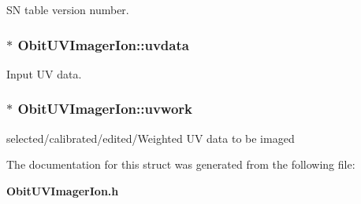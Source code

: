 SN table version number. 

\subsubsection{$\ast$ {\bf Obit\-UVImager\-Ion::uvdata}}\label{structObitUVImagerIon_o4}


Input UV data. 

\subsubsection{$\ast$ {\bf Obit\-UVImager\-Ion::uvwork}}\label{structObitUVImagerIon_o5}


selected/calibrated/edited/Weighted UV data to be imaged 



The documentation for this struct was generated from the following file:\begin{CompactItemize}
\item 
{\bf Obit\-UVImager\-Ion.h}\end{CompactItemize}
